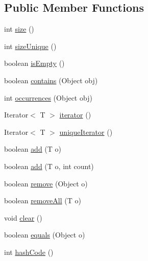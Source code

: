 \subsection*{Public Member Functions}
\begin{DoxyCompactItemize}
\item 
int \hyperlink{interfaceorg_1_1tzi_1_1use_1_1util_1_1collections_1_1_bag_3_01_t_01_4_a1852d0b34dcb2749b78f071b6baea38b}{size} ()
\item 
int \hyperlink{interfaceorg_1_1tzi_1_1use_1_1util_1_1collections_1_1_bag_3_01_t_01_4_aa0606d9e31892bf721868be0de490e18}{size\-Unique} ()
\item 
boolean \hyperlink{interfaceorg_1_1tzi_1_1use_1_1util_1_1collections_1_1_bag_3_01_t_01_4_af0578c03f9283a4c19247c723a3f75fc}{is\-Empty} ()
\item 
boolean \hyperlink{interfaceorg_1_1tzi_1_1use_1_1util_1_1collections_1_1_bag_3_01_t_01_4_ad915cbcc36e277de56e27db626b94544}{contains} (Object obj)
\item 
int \hyperlink{interfaceorg_1_1tzi_1_1use_1_1util_1_1collections_1_1_bag_3_01_t_01_4_ac66d443e9585511fe2bcaa3e4b78123e}{occurrences} (Object obj)
\item 
Iterator$<$ T $>$ \hyperlink{interfaceorg_1_1tzi_1_1use_1_1util_1_1collections_1_1_bag_3_01_t_01_4_ab6900f057b0756c4d4c9231b1bf80e0b}{iterator} ()
\item 
Iterator$<$ T $>$ \hyperlink{interfaceorg_1_1tzi_1_1use_1_1util_1_1collections_1_1_bag_3_01_t_01_4_afc19907286b583ef31b7e03922f3fc31}{unique\-Iterator} ()
\item 
boolean \hyperlink{interfaceorg_1_1tzi_1_1use_1_1util_1_1collections_1_1_bag_3_01_t_01_4_aa428329205f2d87a3f1171cef99be0ae}{add} (T o)
\item 
boolean \hyperlink{interfaceorg_1_1tzi_1_1use_1_1util_1_1collections_1_1_bag_3_01_t_01_4_ae21cf4cb45d9b68039cf1511db3fb4dc}{add} (T o, int count)
\item 
boolean \hyperlink{interfaceorg_1_1tzi_1_1use_1_1util_1_1collections_1_1_bag_3_01_t_01_4_a8394ac65467e59e59961e3d786491e17}{remove} (Object o)
\item 
boolean \hyperlink{interfaceorg_1_1tzi_1_1use_1_1util_1_1collections_1_1_bag_3_01_t_01_4_ab948c804d2bf3fb91a072b1559811ec0}{remove\-All} (T o)
\item 
void \hyperlink{interfaceorg_1_1tzi_1_1use_1_1util_1_1collections_1_1_bag_3_01_t_01_4_a204075b299cb378f1a066a31d003ac92}{clear} ()
\item 
boolean \hyperlink{interfaceorg_1_1tzi_1_1use_1_1util_1_1collections_1_1_bag_3_01_t_01_4_ab67e56522681d61d94bd1f83b9d57d2c}{equals} (Object o)
\item 
int \hyperlink{interfaceorg_1_1tzi_1_1use_1_1util_1_1collections_1_1_bag_3_01_t_01_4_a5f19ae56efa086e66348001fc10c6c45}{hash\-Code} ()
\end{DoxyCompactItemize}


